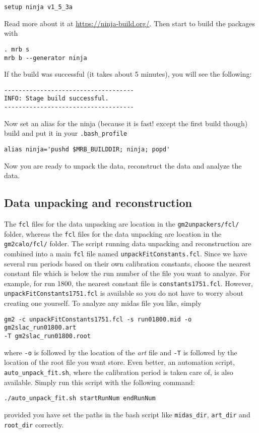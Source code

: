 %
\begin{Verbatim}[frame=single]
setup ninja v1_5_3a
\end{Verbatim}
%
Read more about it at \url{https://ninja-build.org/}.
Then start to build the packages with
%
\begin{Verbatim}[frame=single]
. mrb s
mrb b --generator ninja
\end{Verbatim}
%
If the build was successful (it takes about 5 minutes), you will see the following:
%
\begin{Verbatim}[frame=single]
------------------------------------
INFO: Stage build successful.
------------------------------------
\end{Verbatim}
%
Now set an alias for the ninja (because it is fast! except the first build though) build and put it in your \verb+.bash_profile+
%
\begin{Verbatim}[frame=single]
alias ninja='pushd $MRB_BUILDDIR; ninja; popd'
\end{Verbatim}
%
Now you are ready to unpack the data, reconstruct the data and analyze the data.

\subsection{Data unpacking and reconstruction}

The \verb+fcl+ files for the data unpacking are location in the \verb+gm2unpackers/fcl/+ folder,
whereas the \verb+fcl+ files for the data unpacking are location in the \verb+gm2calo/fcl/+ folder.
The script running  data unpacking and reconstruction are combined into a main \verb+fcl+ file named \verb+unpackFitConstants.fcl+.
Since we have several run periods based on their own calibration constants,
choose the nearest constant file which is below the run number of the file you want to analyze. For example, for run 1800, the nearest
constant file is \verb+constants1751.fcl+. However, \verb+unpackFitConstants1751.fcl+ is available so you do not have to worry about creating one yourself.
To analyze any midas file you like, simply
%
\begin{Verbatim}[frame=single]
gm2 -c unpackFitConstants1751.fcl -s run01800.mid -o gm2slac_run01800.art
-T gm2slac_run01800.root
\end{Verbatim}
%
where \verb+-o+ is followed by the location of the \textit{art} file and \verb+-T+ is followed by the location of the root file you want store.
Even better, an automation script, \verb+auto_unpack_fit.sh+, where the calibration period is taken care of, is also available. Simply run this script with the
following command:
%
\begin{Verbatim}[frame=single]
./auto_unpack_fit.sh startRunNum endRunNum
\end{Verbatim}
%
provided you have set the paths in the bash script like \verb+midas_dir+, \verb+art_dir+ and \verb+root_dir+ correctly.
